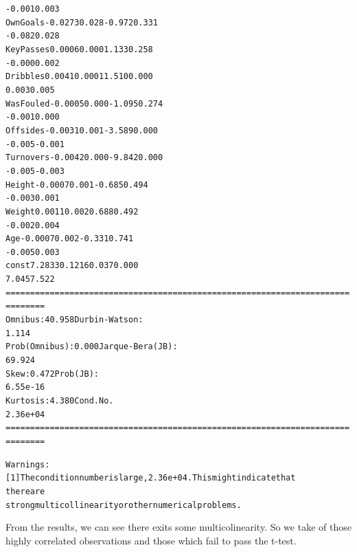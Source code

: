 \documentclass[letterpaper,10pt,english]{/usr/local/lib/python2.7/dist-packages/sphinx/texinputs/sphinxhowto}
\newenvironment{InvisibleVerbatim}
        {\begin{mdframed}[leftmargin=0.1\linewidth,innerleftmargin=3pt,innerrightmargin=3pt, userdefinedwidth=1\linewidth, linewidth=0pt, linecolor=white, usetwoside=false]}
        {\end{mdframed}}
\begin{document}
\begin{InvisibleVerbatim}
\begin{alltt}
-0.001     0.003
OwnGoals           -0.0273      0.028     -0.972      0.331
-0.082     0.028
KeyPasses           0.0006      0.000      1.133      0.258
-0.000     0.002
Dribbles            0.0041      0.000     11.510      0.000
0.003     0.005
WasFouled          -0.0005      0.000     -1.095      0.274
-0.001     0.000
Offsides           -0.0031      0.001     -3.589      0.000
-0.005    -0.001
Turnovers          -0.0042      0.000     -9.842      0.000
-0.005    -0.003
Height             -0.0007      0.001     -0.685      0.494
-0.003     0.001
Weight              0.0011      0.002      0.688      0.492
-0.002     0.004
Age                -0.0007      0.002     -0.331      0.741
-0.005     0.003
const               7.2833      0.121     60.037      0.000
7.045     7.522
======================================================================
========
Omnibus:                       40.958   Durbin-Watson:
1.114
Prob(Omnibus):                  0.000   Jarque-Bera (JB):
69.924
Skew:                           0.472   Prob(JB):
6.55e-16
Kurtosis:                       4.380   Cond. No.
2.36e+04
======================================================================
========

Warnings:
[1] The condition number is large, 2.36e+04. This might indicate that
there are
strong multicollinearity or other numerical problems.
\end{alltt}

            \end{InvisibleVerbatim}
            
        
    
From the results, we can see there exits some multicolinearity. So we
take of those highly correlated observations and those which fail to
pass the t-test.

\end{document}
